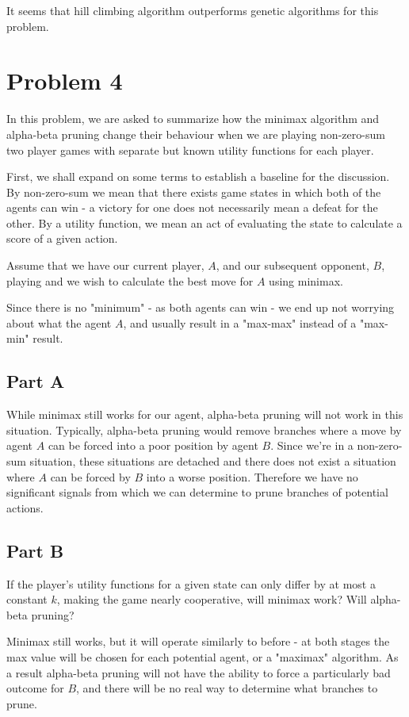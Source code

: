 \documentclass{article}
\begin{document}
It seems that hill climbing algorithm outperforms genetic algorithms for this problem.

\section*{Problem 4}

In this problem, we are asked to summarize how the minimax algorithm and alpha-beta pruning change their behaviour when we are playing non-zero-sum two player games with separate but known utility functions for each player.

First, we shall expand on some terms to establish a baseline for the discussion. By non-zero-sum we mean that there exists game states in which both of the agents can win - a victory for one does not necessarily mean a defeat for the other. By a utility function, we mean an act of evaluating the state to calculate a score of a given action.

Assume that we have our current player, $A$, and our subsequent opponent, $B$, playing and we wish to calculate the best move for $A$ using minimax. 

Since there is no "minimum" - as both agents can win - we end up not worrying about what the agent $A$, and usually result in a "max-max" instead of a "max-min" result.

\subsection*{Part A}

While minimax still works for our agent, alpha-beta pruning will not work in this situation. Typically, alpha-beta pruning would remove branches where a move by agent $A$ can be forced into a poor position by agent $B$. Since we're in a non-zero-sum situation, these situations are detached and there does not exist a situation where $A$ can be forced by $B$ into a worse position. Therefore we have no significant signals from which we can determine to prune branches of potential actions.

\subsection*{Part B}

If the player's utility functions for a given state can only differ by at most a constant $k$, making the game nearly cooperative, will minimax work? Will alpha-beta pruning?

Minimax still works, but it will operate similarly to before - at both stages the max value will be chosen for each potential agent, or a "maximax" algorithm. As a result alpha-beta pruning will not have the ability to force a particularly bad outcome for $B$, and there will be no real way to determine what branches to prune.
\end{document}
